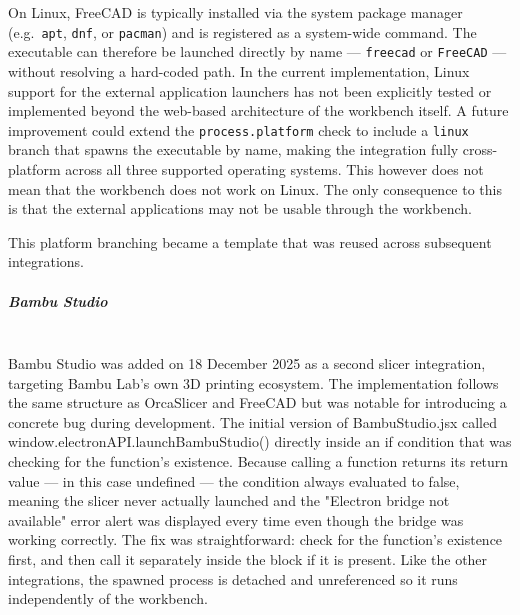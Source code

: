 \documentclass[a4paper,12pt]{article}
\begin{document}
\begin{notebox}
On Linux, FreeCAD is typically installed via the system package manager 
(e.g.\ \texttt{apt}, \texttt{dnf}, or \texttt{pacman}) and is registered 
as a system-wide command. The executable can therefore be launched directly 
by name — \texttt{freecad} or \texttt{FreeCAD} — without resolving a 
hard-coded path. In the current implementation, Linux support for the 
external application launchers has not been explicitly tested or 
implemented beyond the web-based architecture of the workbench itself. 
A future improvement could extend the \texttt{process.platform} check 
to include a \texttt{linux} branch that spawns the executable by name, 
making the integration fully cross-platform across all three supported 
operating systems.
This however does not mean that the workbench does not work on Linux. The only consequence to this is that the external applications may not be usable through the workbench. 
\end{notebox}

This platform branching became a template that was reused across subsequent integrations.

\subparagraph{Bambu Studio} \mbox{} \\
Bambu Studio\cite{bambustudio} was added on 18 December 2025 as a second slicer integration, targeting Bambu Lab's own 3D printing ecosystem. The implementation follows the same structure as OrcaSlicer and FreeCAD but was notable for introducing a concrete bug during development. The initial version of BambuStudio.jsx called \newline
window.electronAPI.launchBambuStudio() directly inside an if condition that was checking for the function's existence. Because calling a function returns its return value — in this case undefined — the condition always evaluated to false, meaning the slicer never actually launched and the "Electron bridge not available" error alert was displayed every time even though the bridge was working correctly. The fix was straightforward: check for the function's existence first, and then call it separately inside the block if it is present. Like the other integrations, the spawned process is detached and unreferenced so it runs independently of the workbench.
\end{document}
